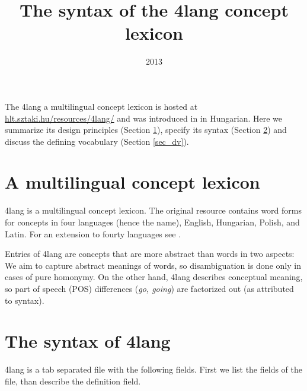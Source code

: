 \documentclass[a4paper,10pt]{article}
\title{The syntax of the 4lang concept lexicon}
\date{2013}
\begin{document}
\maketitle
The 4lang a multilingual concept lexicon is hosted at \url{hlt.sztaki.hu/resources/4lang/} and was introduced in \cite{Kornai:2013} in Hungarian. Here we summarize its design principles (Section \ref{sec_principles}), specify its syntax (Section \ref{sec_synt}) and discuss the defining vocabulary (Section \ref{sec_dv}).
\section{A multilingual concept lexicon}\label{sec_principles}
4lang is a multilingual concept lexicon. The original resource contains word forms for concepts in four languages (hence the name), English, Hungarian, Polish, and Latin. For an extension to fourty languages see \cite{Acs:2013}.

Entries of 4lang are concepts that are more abstract than words in two aspects: We aim to capture abstract meanings of words, so disambiguation is done only in cases of pure homonymy. On the other hand, 4lang describes conceptual meaning, so part of speech (POS) differences (\emph{go, going}) are factorized out (as attributed to syntax).
\section{The syntax of 4lang}\label{sec_synt}
4lang is a tab separated file with the following fields. First we list the fields of the file, than describe the definition field.
\end{document}
